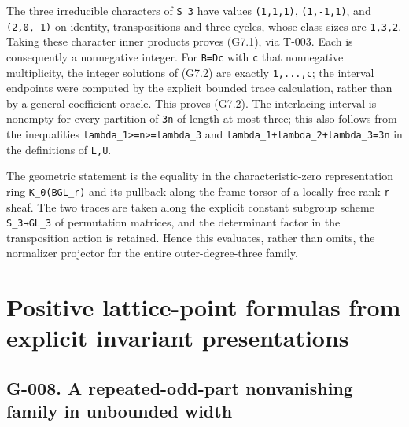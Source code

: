 \documentclass[
  10pt,
]{article}
\begin{document}
The three irreducible characters of \texttt{\small S\_\allowbreak{}3}
have values
\texttt{\small (\allowbreak{}1,\allowbreak{}1,\allowbreak{}1)\allowbreak{}},
\texttt{\small (\allowbreak{}1,\allowbreak{}-\allowbreak{}1,\allowbreak{}1)\allowbreak{}},
and
\texttt{\small (\allowbreak{}2,\allowbreak{}0,\allowbreak{}-\allowbreak{}1)\allowbreak{}}
on identity, transpositions and three-cycles, whose class sizes are
\texttt{\small 1,\allowbreak{}3,\allowbreak{}2}. Taking these character
inner products proves (G7.1), via T-003. Each is consequently a
nonnegative integer. For \texttt{\small B=\allowbreak{}Dc} with
\texttt{\small c} that nonnegative multiplicity, the integer solutions
of (G7.2) are exactly \texttt{\small 1,\allowbreak{}...,\allowbreak{}c};
the interval endpoints were computed by the explicit bounded trace
calculation, rather than by a general coefficient oracle. This proves
(G7.2). The interlacing interval is nonempty for every partition of
\texttt{\small 3n} of length at most three; this also follows from the
inequalities
\texttt{\small lambda\_\allowbreak{}1>=\allowbreak{}n>=\allowbreak{}lambda\_\allowbreak{}3}
and
\texttt{\small lambda\_\allowbreak{}1+\allowbreak{}lambda\_\allowbreak{}2+\allowbreak{}lambda\_\allowbreak{}3=\allowbreak{}3n}
in the definitions of \texttt{\small L,\allowbreak{}U}.

The geometric statement is the equality in the characteristic-zero
representation ring
\texttt{\small K\_\allowbreak{}0(\allowbreak{}BGL\_\allowbreak{}r)\allowbreak{}}
and its pullback along the frame torsor of a locally free
rank-\texttt{\small r} sheaf. The two traces are taken along the
explicit constant subgroup scheme
\texttt{\small S\_\allowbreak{}3→\allowbreak{}GL\_\allowbreak{}3} of
permutation matrices, and the determinant factor in the transposition
action is retained. Hence this evaluates, rather than omits, the
normalizer projector for the entire outer-degree-three family.

\section{Positive lattice-point formulas from explicit invariant
presentations}\label{positive-lattice-point-formulas-from-explicit-invariant-presentations}

\subsection{G-008. A repeated-odd-part nonvanishing family in unbounded
width}\label{g-008.-a-repeated-odd-part-nonvanishing-family-in-unbounded-width}
\end{document}
